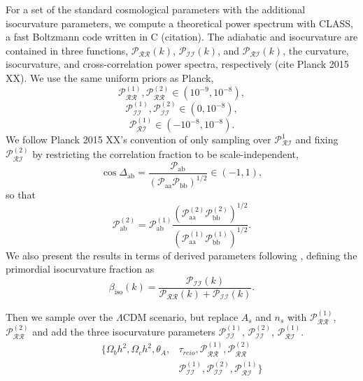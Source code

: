 \documentclass{emulateapj}
\newcommand{\prr}{ \mathcal{P}_{\mathcal{R}\mathcal{R}} }
\newcommand{\pri}{ \mathcal{P}_{\mathcal{R}\mathcal{I}} }
\newcommand{\pii}{ \mathcal{P}_{\mathcal{I}\mathcal{I}} }
\begin{document}
For a set of the standard cosmological parameters with the additional isocurvature parameters, we compute a theoretical power spectrum with CLASS, a fast Boltzmann code written in C (citation). The adiabatic and isocurvature are contained in three functions, $\mathcal{P}_{\mathcal{RR}}(k)$, $\mathcal{P}_{\mathcal{II}}(k)$, and $\mathcal{P}_{\mathcal{RI}}(k)$, the curvature, isocurvature, and cross-correlation power spectra, respectively (cite Planck 2015 XX).  We use the same uniform priors as Planck,
\begin{equation}
    \prr^{(1)}, \prr^{(2)} \in (10^{-9}, 10^{-8}),
\end{equation}
\begin{equation}
    \pii^{(1)}, \pii^{(2)} \in (0, 10^{-8}),
\end{equation}
\begin{equation}
    \pri^{(1)} \in (-10^{-8}, 10^{-8}).
\end{equation}
We follow Planck 2015 XX's convention of only sampling over $\pri^1$ and fixing $\pri^{(2)}$ by restricting the correlation fraction to be scale-independent,
\begin{equation}
\cos \Delta_{\text{ab}} = \frac{\mathcal{P}_{\text{ab}}}{(\mathcal{P}_{\text{aa}} \mathcal{P}_{\text{bb}})^{1/2}} \in (-1,1),
\end{equation}
so that
\begin{equation}
\mathcal{P}_{\text{ab}}^{(2)} = \mathcal{P}_{\text{ab}}^{(1)} \frac{\left(\mathcal{P}_{\text{aa}}^{(2)} \mathcal{P}_{\text{bb}}^{(2)} \right)^{1/2}}{ \left(\mathcal{P}_{\text{aa}}^{(1)} \mathcal{P}_{\text{bb}}^{(1)} \right)^{1/2}}.
\end{equation}
We also present the results in terms of derived parameters following \cite{planckXX:2015}, defining the primordial isocurvature fraction as
\begin{equation}
\beta_{\text{iso}}(k) = \frac{\pii(k)}{\prr(k) + \pii(k)}.
\end{equation}

Then we sample over the $\Lambda$CDM scenario, but replace $A_s$ and $n_s$ with $\prr^{(1)}$,  $\prr^{(2)}$ and add the three isocurvature parameters $\pii^{(1)}$, $\pii^{(2)}$, $\pri^{(1)}$.
\begin{align}
\{ \Omega_b h^2, \Omega_c h^2, \theta_A, &\tau_{reio}, \prr^{(1)}, \mathcal{P}_{\mathcal{RR}}^{(2)} \\
& \pii^{(1)}, \pii^{(2)}, \pri^{(1)}    \}
\end{align}
\end{document}
